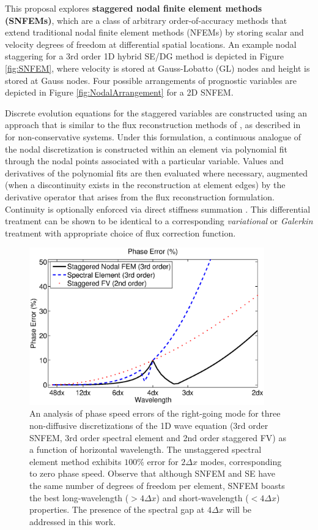 \documentclass[11pt]{article}
\begin{document}
This proposal explores \textbf{staggered nodal finite element methods (SNFEMs)}, which are a class of arbitrary order-of-accuracy methods that extend traditional nodal finite element methods (NFEMs) by storing scalar and velocity degrees of freedom at differential spatial locations.  An example nodal staggering for a 3rd order 1D hybrid SE/DG method is depicted in Figure \ref{fig:SNFEM}, where velocity is stored at Gauss-Lobatto (GL) nodes and height is stored at Gauss nodes.  Four possible arrangements of prognostic variables are depicted in Figure \ref{fig:NodalArrangement} for a 2D SNFEM.

Discrete evolution equations for the staggered variables are constructed using an approach that is similar to the flux reconstruction methods of \cite{huynh2007flux}, as described in \cite{ullrich2014global} for non-conservative systems.  Under this formulation, a continuous analogue of the nodal discretization is constructed within an element via polynomial fit through the nodal points associated with a particular variable.  Values and derivatives of the polynomial fits are then evaluated where necessary, augmented (when a discontinuity exists in the reconstruction at element edges) by the derivative operator that arises from the flux reconstruction formulation.  Continuity is optionally enforced via direct stiffness summation \cite{ronquist1987spectral}.  This differential treatment can be shown to be identical to a corresponding \textit{variational} or \textit{Galerkin} treatment with appropriate choice of flux correction function.

\begin{figure}[t]
\begin{center}
\includegraphics[width=4in, clip=true, trim=0cm 0.1cm 0cm 0.1cm]{PhaseErrors}
\end{center}
\caption{An analysis of phase speed errors of the right-going mode for three non-diffusive discretizations of the 1D wave equation (3rd order SNFEM, 3rd order spectral element and 2nd order staggered FV) as a function of horizontal wavelength.  The unstaggered spectral element method exhibits $100\%$ error for $2 \Delta x$ modes, corresponding to zero phase speed.  Observe that although SNFEM and SE have the same number of degrees of freedom per element, SNFEM boasts the best long-wavelength ($> 4 \Delta x$) and short-wavelength ($< 4 \Delta x$) properties.  The presence of the spectral gap at $4 \Delta x$ will be addressed in this work.} \label{fig:SNFEMEigenstructure}
\end{figure}
\end{document}
